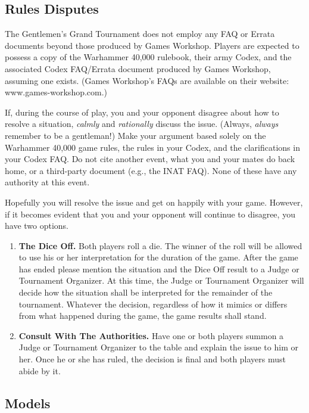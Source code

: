 \documentclass[12pt,titlepage]{article}
\begin{document}
\subsection*{Rules Disputes}

The Gentlemen's Grand Tournament does not employ any FAQ or Errata documents beyond those produced by Games Workshop. Players are expected to possess a copy of the Warhammer 40,000 rulebook, their army Codex, and the associated Codex FAQ/Errata document produced by Games Workshop, assuming one exists. (Games Workshop's FAQs are available on their website: www.games-workshop.com.)

If, during the course of play, you and your opponent disagree about how to resolve a situation, \textit{calmly} and \textit{rationally} discuss the issue. (Always, \textit{always} remember to be a gentleman!) Make your argument based solely on the Warhammer 40,000 game rules, the rules in your Codex, and the clarifications in your Codex FAQ. Do not cite another event, what you and your mates do back home, or a third-party document (e.g., the INAT FAQ). None of these have any authority at this event.

Hopefully you will resolve the issue and get on happily with your game. However, if it becomes evident that you and your opponent will continue to disagree, you have two options.

\begin{enumerate}
\item \textbf{The Dice Off.} Both players roll a die. The winner of the roll will be allowed to use his or her interpretation for the duration of the game. After the game has ended please mention the situation and the Dice Off result to a Judge or Tournament Organizer. At this time, the Judge or Tournament Organizer will decide how the situation shall be interpreted for the remainder of the tournament. Whatever the decision, regardless of how it mimics or differs from what happened during the game, the game results shall stand.

\item \textbf{Consult With The Authorities.} Have one or both players summon a Judge or Tournament Organizer to the table and explain the issue to him or her. Once he or she has ruled, the decision is final and both players must abide by it.
\end{enumerate}

\subsection*{Models}
\end{document}
